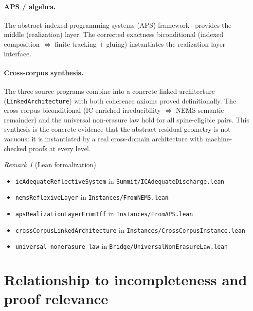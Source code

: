 \documentclass[11pt,a4paper]{article}
\theoremstyle{plain}
\theoremstyle{definition}
\theoremstyle{remark}
\newtheorem{remark}[theorem]{Remark}
\begin{document}
\paragraph{APS / algebra.}
The abstract indexed programming systems (APS) framework~\cite{Spivack2026-APS}
provides the middle (realization) layer. The corrected exactness biconditional
(indexed composition $\Leftrightarrow$ finite tracking $+$ gluing) instantiates
the realization layer interface.

\paragraph{Cross-corpus synthesis.}
The three source programs combine into a concrete linked architecture
(\texttt{LinkedArchitecture}) with both coherence axioms proved definitionally.
The cross-corpus biconditional (IC enriched irreducibility
$\Leftrightarrow$ NEMS semantic remainder) and the universal non-erasure law
hold for all spine-eligible pairs. This synthesis is the concrete evidence that
the abstract residual geometry is not vacuous: it is instantiated by a real
cross-domain architecture with machine-checked proofs at every level.

\begin{remark}[Lean formalization]
\leavevmode\par\begin{itemize}[nosep,leftmargin=*,before=\raggedright]
\item \texttt{icAdequateReflectiveSystem} in \texttt{Summit/ICAdequateDischarge.lean}
\item \texttt{nemsReflexiveLayer} in \texttt{Instances/FromNEMS.lean}
\item \texttt{apsRealizationLayerFromIff} in \texttt{Instances/FromAPS.lean}
\item \texttt{crossCorpusLinkedArchitecture} in \texttt{Instances/CrossCorpusInstance.lean}
\item \texttt{universal\_nonerasure\_law} in \texttt{Bridge/UniversalNonErasureLaw.lean}
\end{itemize}
\end{remark}

\section{Relationship to incompleteness and proof relevance}\label{sec:related}
\end{document}
